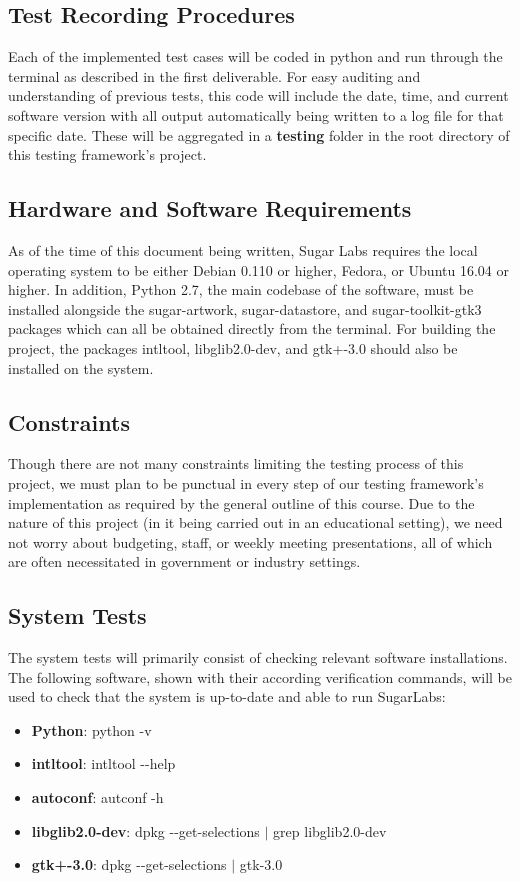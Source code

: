 \documentclass{article}
\begin{document}
\subsection{Test Recording Procedures}
Each of the implemented test cases will be coded in python and run through the terminal as described in the first deliverable. For easy auditing and understanding of previous tests, this code will include the date, time, and current software version with all output automatically being written to a log file for that specific date. These will be aggregated in a \textbf{testing} folder in the root directory of this testing framework's project.
\subsection{Hardware and Software Requirements}
As of the time of this document being written, Sugar Labs requires the local operating system to be either Debian 0.110 or higher, Fedora, or Ubuntu 16.04 or higher. In addition, Python 2.7, the main codebase of the software, must be installed alongside the sugar-artwork, sugar-datastore, and sugar-toolkit-gtk3 packages which can all be obtained directly from the terminal. For building the project, the packages intltool, libglib2.0-dev, and gtk+-3.0 should also be installed on the system. 
\subsection{Constraints}
Though there are not many constraints limiting the testing process of this project, we must plan to be punctual in every step of our testing framework's implementation as required by the general outline of this course. Due to the nature of this project (in it being carried out in an educational setting), we need not worry about budgeting, staff, or weekly meeting presentations, all of which are often necessitated in government or industry settings.
\subsection{System Tests}
The system tests will primarily consist of checking relevant software installations. The following software, shown with their according verification commands, will be used to check that the system is up-to-date and able to run SugarLabs:
\begin{itemize}
\itemsep-0.5em
\item \textbf{Python}: python -v
\item \textbf{intltool}: intltool -\--help
\item \textbf{autoconf}: autconf -h
\item \textbf{libglib2.0-dev}: dpkg -\--get-selections $\mid$ grep libglib2.0-dev
\item \textbf{gtk+-3.0}: dpkg -\--get-selections $\mid$ gtk-3.0
\end{itemize}
\end{document}
